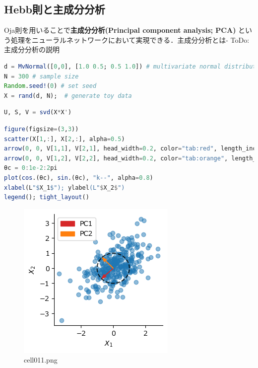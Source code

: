 \subsection{Hebb則と主成分分析}
Oja則を用いることで\textbf{主成分分析(Principal component analysis; PCA)} という処理をニューラルネットワークにおいて実現できる．主成分分析とは-
ToDo:主成分分析の説明
\begin{lstlisting}[language=julia]
d = MvNormal([0,0], [1.0 0.5; 0.5 1.0]) # multivariate normal distribution
N = 300 # sample size
Random.seed!(0) # set seed
X = rand(d, N);  # generate toy data
\end{lstlisting}
\begin{lstlisting}[language=julia]
U, S, V = svd(X*X')
\end{lstlisting}
\begin{lstlisting}[language=julia]
figure(figsize=(3,3))
scatter(X[1,:], X[2,:], alpha=0.5)
arrow(0, 0, V[1,1], V[2,1], head_width=0.2, color="tab:red", length_includes_head=true, label="PC1")
arrow(0, 0, V[1,2], V[2,2], head_width=0.2, color="tab:orange", length_includes_head=true, label="PC2")
θc = 0:1e-2:2pi
plot(cos.(θc), sin.(θc), "k--", alpha=0.8)
xlabel(L"$X_1$"); ylabel(L"$X_2$")
legend(); tight_layout()
\end{lstlisting}
\begin{figure}[ht]
	\centering
	\includegraphics[scale=0.8, max width=\linewidth]{./fig/local-learning-rule/pca-hebbian-learning/cell011.png}
	\caption{cell011.png}
	\label{cell011.png}
\end{figure}
